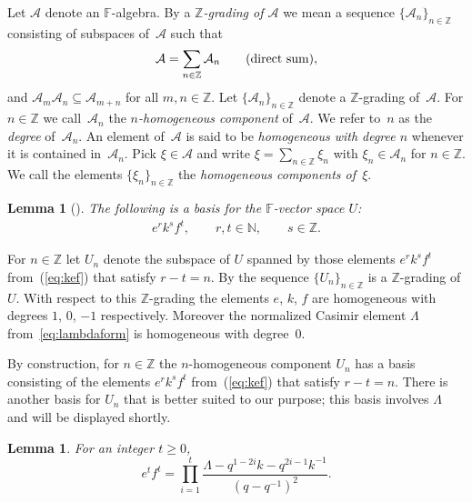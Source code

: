 \documentclass[11pt]{article}
\numberwithin{equation}{section}
\newtheorem{Lemma}[Theorem]{Lemma}
\begin{document}
Let $\mathcal A$ denote an
$\mathbb F$-algebra.
By a {\it $\mathbb Z$-grading of $\mathcal A$} we mean a sequence
 $\lbrace {\mathcal A}_n \rbrace_{n\in \mathbb Z}$ consisting of
 subspaces of~$\mathcal A$
 such
that
\begin{gather*}
{\mathcal A} = \sum_{n\in \mathbb Z} \mathcal A_n
\qquad
{\mbox {\rm {(direct sum)}}},
\end{gather*}
and $\mathcal A_m \mathcal A_n \subseteq \mathcal A_{m+n}$
for all $m,n \in \mathbb Z$. Let
$\lbrace {\mathcal A}_n \rbrace_{n\in \mathbb Z}$ denote
a $\mathbb Z$-grading of~$\mathcal A$.
For $n \in \mathbb Z$
we call~$\mathcal A_n$ the {\it $n$-homogeneous component} of~$\mathcal A$.
We refer to~$n$ as the {\it degree}
of~$\mathcal A_n$.
An element of~$\mathcal A$ is
said to be {\it homogeneous with degree $n$} whenever
it is contained in~$\mathcal A_n$. Pick $\xi \in \mathcal A$
and write
$\xi = \sum\limits_{n \in \mathbb Z} \xi_n$ with
$\xi_n \in \mathcal A_n$ for $n \in \mathbb Z$.
We call the elements $\lbrace \xi_n\rbrace_{n\in \mathbb Z}$
the {\it homogeneous components of~$\xi$}.




\begin{Lemma}[]
\label{lem:efkbasis}
The following is a basis for the $\mathbb F$-vector space
$U$:
\begin{gather}
e^r k^s f^t, \qquad   r,t\in \mathbb N, \qquad  s \in \mathbb Z.
\label{eq:kef}
\end{gather}
\end{Lemma}


For $n \in \mathbb Z$ let $U_n$ denote the subspace of
$U$  spanned
by those elements
$e^r k^s f^t$ from~(\ref{eq:kef}) that satisfy
$r-t=n$.
By \cite[Section~1.9]{jantzen} the sequence
$\lbrace U_n\rbrace_{n\in \mathbb Z}$ is a $\mathbb Z$-grading
of
$U$.
With respect to this $\mathbb Z$-grading the elements
$e$, $k$, $f$ are homogeneous with degrees
$1$, $0$, $-1$ respectively. Moreover the normalized
Casimir element $\Lambda$ from~\eqref{eq:lambdaform}
is homogeneous with degree~0.


By construction,
for $n \in \mathbb Z$ the $n$-homogeneous component
$U_n$ has a basis consisting of the elements
$e^r k^s f^t$ from~(\ref{eq:kef}) that satisfy
$r-t=n$. There is another basis for
$U_n$ that is better suited to our purpose;
this basis involves $\Lambda $ and
 will be displayed shortly.


\begin{Lemma}
\label{lem:ident}
For an integer $t\geq 0$,
\[
e^t f^t = \prod_{i=1}^t \frac{\Lambda -q^{1-2i}k-q^{2i-1}k^{-1}}{(q-q^{-1})^2}.
\]
\end{Lemma}
\end{document}
